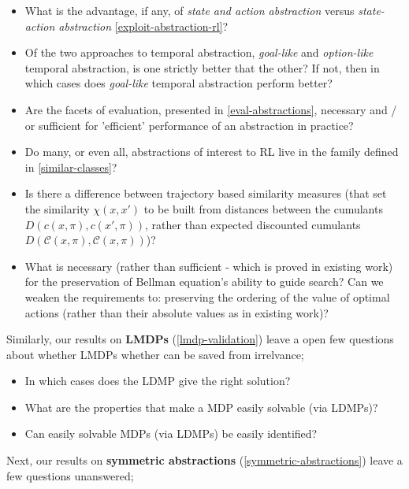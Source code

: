 \begin{itemize}
	\tightlist
	\item What is the advantage, if any, of \textit{state and action abstraction} versus \textit{state-action abstraction} \ref{exploit-abstraction-rl}?
	\item Of the two approaches to temporal abstraction, \textit{goal-like} and \textit{option-like} temporal abstraction, is one strictly better that the other? If not, then in which cases does \textit{goal-like} temporal abstraction perform better?
	\item Are the facets of evaluation, presented in \ref{eval-abstractions}, necessary and / or sufficient for 'efficient' performance of an abstraction in practice?
	\item Do many, or even all, abstractions of interest to RL live in the family defined in \ref{similar-classes}?
	\item Is there a difference between trajectory based similarity measures (that set the similarity $\chi(x, x')$ to be built from distances between the cumulants $D(c(x, \pi), c(x', \pi))$, rather than expected discounted cumulants $D(\mathcal C(x, \pi), \mathcal C(x, \pi))$)?
	\item What is necessary (rather than sufficient - which is proved in existing work) for the preservation of Bellman equation's ability to guide search? Can we weaken the requirements to: preserving the ordering of the value of optimal actions (rather than their absolute values as in existing work)?
\end{itemize}

\newpage
Similarly, our results on \textbf{LMDPs} (\ref{lmdp-validation}) leave a open few questions about whether LMDPs whether can be saved from irrelvance;

\begin{itemize}
	\tightlist
	\item In which cases does the LDMP give the right solution?
	\item What are the properties that make a MDP easily solvable (via LDMPs)?
	\item Can easily solvable MDPs (via LDMPs) be easily identified?
\end{itemize}

Next, our results on \textbf{symmetric abstractions} (\ref{symmetric-abstractions}) leave a few questions unanswered;

